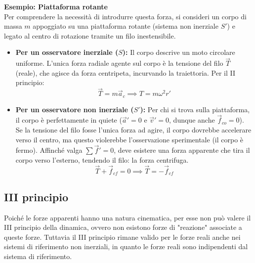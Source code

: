 \documentclass[11pt, a4paper, openright]{book}
\theoremstyle{plain}
\theoremstyle{definition}
\begin{document}
\textbf{Esempio: Piattaforma rotante} \\
Per comprendere la necessità di introdurre questa forza, si consideri un corpo di massa $m$ appoggiato su una piattaforma rotante (sistema non inerziale $S'$) e legato al centro di rotazione tramite un filo inestensibile.
\begin{itemize}
    \item \textbf{Per un osservatore inerziale ($S$):} Il corpo descrive un moto circolare uniforme. L'unica forza radiale agente sul corpo è la tensione del filo $\vec{T}$ (reale), che agisce da forza centripeta, incurvando la traiettoria. Per il II principio: 
    \[\vec{T} = m\vec{a}_c \implies T = m\omega^2 r'\]
    \item \textbf{Per un osservatore non inerziale ($S'$):} Per chi si trova sulla piattaforma, il corpo è perfettamente in quiete ($\vec{a}' = 0$ e $\vec{v}' = 0$, dunque anche $\vec{f}_{co} = 0$). Se la tensione del filo fosse l'unica forza ad agire, il corpo dovrebbe accelerare verso il centro, ma questo violerebbe l'osservazione sperimentale (il corpo è fermo). Affinché valga $\sum \vec{f}' = 0$, deve esistere una forza apparente che tira il corpo verso l'esterno, tendendo il filo: la forza centrifuga.
    \[\vec{T} + \vec{f}_{cf} = 0 \implies \vec{T} = -\vec{f}_{cf}\]
\end{itemize}

\subsection{III principio}
Poiché le forze apparenti hanno una natura cinematica, per esse non può valere il III principio della dinamica, ovvero non esistono forze di "reazione" associate a queste forze. Tuttavia il III principio rimane valido per le forze reali anche nei sistemi di riferimento non inerziali, in quanto le forze reali sono indipendenti dal sistema di riferimento.
\end{document}
